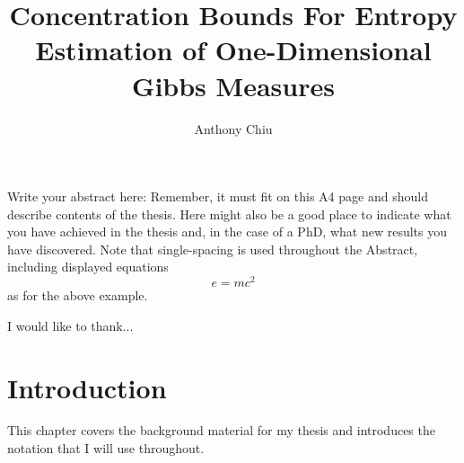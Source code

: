 \documentclass[12pt,MSc]{muthesis}
\begin{document}
\title{Concentration Bounds For Entropy Estimation of One-Dimensional Gibbs Measures}
\author{Anthony Chiu}
\def\wordcount{}



\beforeabstract

Write your abstract here: Remember, it must fit on this A4 page and should
describe contents of the thesis. Here might also be a good place to indicate
what you have achieved in the thesis and, in the case of a PhD, what new
results you have discovered. Note that single-spacing is used throughout the
Abstract, including displayed equations
\[
e = mc^{2}
\]
as for the above example.

\afterabstract

I would like to thank...

\afterpreface



\chapter{Introduction}
This chapter covers the background material for my thesis and introduces
the notation that I will use throughout.

\newpage
\end{document}

